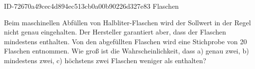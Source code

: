 \begin{exercise}
      {ID-72670a49cec4d894ec513cb0a00b90226d327e83}
      {Flaschen}
  \ifproblem\problem\par
    Beim maschinellen Abfüllen von Halbliter-Flaschen wird der \glqq Sollwert\grqq{}
     in der Regel nicht genau eingehalten. Der Hersteller garantiert
    aber, dass  der Flaschen mindestens  enthalten. Von den
    abgefüllten Flaschen wird eine Stichprobe von 20 Flaschen entnommen. Wie groß
    ist die Wahrscheinlichkeit, dass
    a) genau zwei,
    b) mindestens zwei,
    c) höchstens zwei
    Flaschen weniger als  enthalten?
  \fi
\end{exercise}
